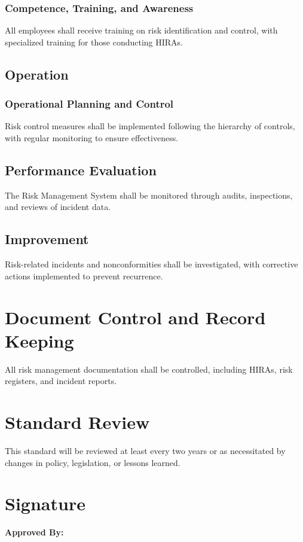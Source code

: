 \documentclass[12pt]{article}
\begin{document}
\subsubsection{Competence, Training, and Awareness}
All employees shall receive training on risk identification and control, with specialized training for those conducting HIRAs.

\subsection{Operation}

\subsubsection{Operational Planning and Control}
Risk control measures shall be implemented following the hierarchy of controls, with regular monitoring to ensure effectiveness.

\subsection{Performance Evaluation}
The Risk Management System shall be monitored through audits, inspections, and reviews of incident data.

\subsection{Improvement}
Risk-related incidents and nonconformities shall be investigated, with corrective actions implemented to prevent recurrence.

\section{Document Control and Record Keeping}
All risk management documentation shall be controlled, including HIRAs, risk registers, and incident reports.

\section{Standard Review}
This standard will be reviewed at least every two years or as necessitated by changes in policy, legislation, or lessons learned.

\section{Signature}
\textbf{Approved By:}
\end{document}
